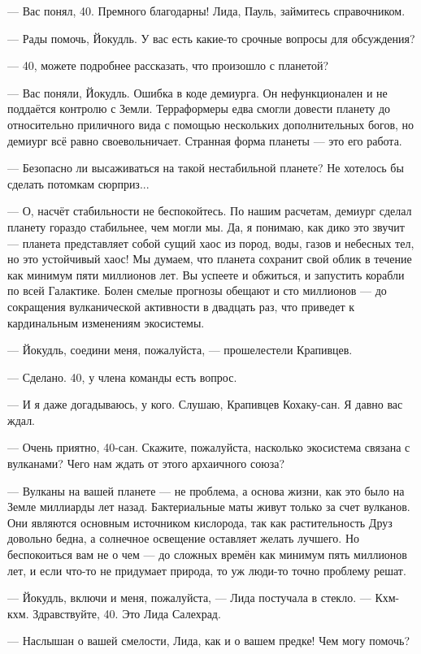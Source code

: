 --- Вас понял, 40.
Премного благодарны!
Лида, Пауль, займитесь справочником.

--- Рады помочь, Йокудль.
У вас есть какие-то срочные вопросы для обсуждения?

--- 40, можете подробнее рассказать, что произошло с планетой?

--- Вас поняли, Йокудль.
Ошибка в коде демиурга.
Он нефункционален и не поддаётся контролю с Земли.
Терраформеры едва смогли довести планету до относительно приличного вида с помощью нескольких дополнительных богов, но демиург всё равно своевольничает.
Странная форма планеты --- это его работа.

--- Безопасно ли высаживаться на такой нестабильной планете?
Не хотелось бы сделать потомкам сюрприз...

--- О, насчёт стабильности не беспокойтесь.
По нашим расчетам, демиург сделал планету гораздо стабильнее, чем могли мы.
Да, я понимаю, как дико это звучит --- планета представляет собой сущий хаос из пород, воды, газов и небесных тел, но это устойчивый хаос!
Мы думаем, что планета сохранит свой облик в течение как минимум пяти миллионов лет.
Вы успеете и обжиться, и запустить корабли по всей Галактике.
Болен смелые прогнозы обещают и сто миллионов --- до сокращения вулканической активности в двадцать раз, что приведет к кардинальным изменениям экосистемы.

--- Йокудль, соедини меня, пожалуйста, --- прошелестели Крапивцев.

--- Сделано.
40, у члена команды есть вопрос.

--- И я даже догадываюсь, у кого.
Слушаю, Крапивцев Кохаку-сан.
Я давно вас ждал.

--- Очень приятно, 40-сан.
Скажите, пожалуйста, насколько экосистема связана с вулканами?
Чего нам ждать от этого архаичного союза?

--- Вулканы на вашей планете --- не проблема, а основа жизни, как это было на Земле миллиарды лет назад.
Бактериальные маты живут только за счет вулканов.
Они являются основным источником кислорода, так как растительность Друз довольно бедна, а солнечное освещение оставляет желать лучшего.
Но беспокоиться вам не о чем --- до сложных времён как минимум пять миллионов лет, и если что-то не придумает природа, то уж люди-то точно проблему решат.

--- Йокудль, включи и меня, пожалуйста, --- Лида постучала в стекло.
--- Кхм-кхм.
Здравствуйте, 40.
Это Лида Салехрад.

--- Наслышан о вашей смелости, Лида, как и о вашем предке!
Чем могу помочь?

